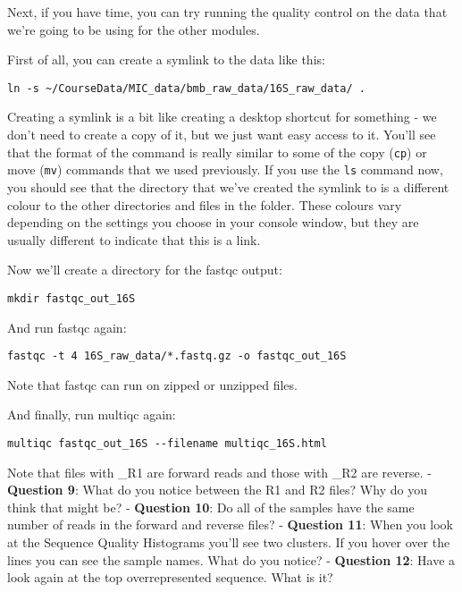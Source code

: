 \documentclass[
]{book}
\begin{document}
Next, if you have time, you can try running the quality control on the data that we're going to be using for the other modules.

First of all, you can create a symlink to the data like this:

\begin{verbatim}
ln -s ~/CourseData/MIC_data/bmb_raw_data/16S_raw_data/ .
\end{verbatim}

Creating a symlink is a bit like creating a desktop shortcut for something - we don't need to create a copy of it, but we just want easy access to it. You'll see that the format of the command is really similar to some of the copy (\texttt{cp}) or move (\texttt{mv}) commands that we used previously. If you use the \texttt{ls} command now, you should see that the directory that we've created the symlink to is a different colour to the other directories and files in the folder. These colours vary depending on the settings you choose in your console window, but they are usually different to indicate that this is a link.

Now we'll create a directory for the fastqc output:

\begin{verbatim}
mkdir fastqc_out_16S
\end{verbatim}

And run fastqc again:

\begin{verbatim}
fastqc -t 4 16S_raw_data/*.fastq.gz -o fastqc_out_16S
\end{verbatim}

Note that fastqc can run on zipped or unzipped files.

And finally, run multiqc again:

\begin{verbatim}
multiqc fastqc_out_16S --filename multiqc_16S.html
\end{verbatim}

Note that files with \_R1 are forward reads and those with \_R2 are reverse.
- \textbf{Question 9}: What do you notice between the R1 and R2 files? Why do you think that might be?
- \textbf{Question 10}: Do all of the samples have the same number of reads in the forward and reverse files?
- \textbf{Question 11}: When you look at the Sequence Quality Histograms you'll see two clusters. If you hover over the lines you can see the sample names. What do you notice?
- \textbf{Question 12}: Have a look again at the top overrepresented sequence. What is it?
\end{document}
